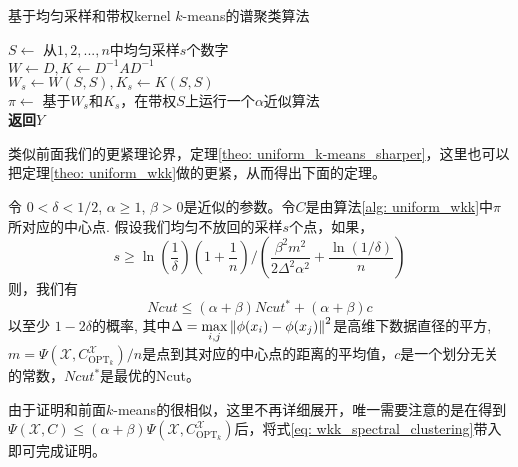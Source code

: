 \begin{algorithm}
	\SetNoFillComment
    \caption{基于均匀采样和带权kernel $k$-means的谱聚类算法}\label{alg: uniform_wkk}
    $S \gets$ 从$1,2,...,n$中均匀采样$s$个数字\\
    $W \gets D,K \gets D^{-1}AD^{-1}$\\
    $W_s \gets W(S,S), K_s \gets K(S,S)$\\
    $\pi \gets$ 基于$W_s$和$K_s$，在带权$S$上运行一个$\alpha$近似算法\\
    \textbf{返回}$Y$
\end{algorithm}
类似前面我们的更紧理论界，定理\ref{theo: uniform_k-means_sharper}，这里也可以把定理\ref{theo: uniform_wkk}做的更紧，从而得出下面的定理。
\begin{theorem}[均匀不放回采样的谱聚类解的质量]
    \label{theo: uniform_wkk_sharper}
    令 $0 < \delta <1/2$, $\alpha \geq 1$, $\beta >0$是近似的参数。令$C$是由算法\ref{alg: uniform_wkk}中$\pi$所对应的中心点. 假设我们均匀不放回的采样$s$个点，如果，
    \begin{equation*}
    s \geq \ln(\frac{1}{\delta})(1+\frac{1}{n})/(\frac{\beta^2 m^2}{2\Delta^2 \alpha^2}+\frac{\ln(1/\delta)}{n})
    \end{equation*}
    则，我们有
    \begin{equation*}
    Ncut \leq (\alpha + \beta) Ncut^* + (\alpha + \beta)c
    \end{equation*}
    以至少 $1-2\delta$的概率, 其中$\Delta = \max\limits_{i,j}\left\lVert\phi(x_i) - \phi(x_j)\right\rVert^2$是高维下数据直径的平方, $m = \Psi(\mathcal{X},C_{\text{OPT}_k}^{\mathcal{X}})/n$是点到其对应的中心点的距离的平均值，$c$是一个划分无关的常数，$Ncut^*$是最优的Ncut。
\end{theorem}
由于证明和前面$k$-means的很相似，这里不再详细展开，唯一需要注意的是在得到$\Psi(\mathcal{X},C) \leq (\alpha+\beta) \Psi(\mathcal{X},C_{\text{OPT}_k}^{\mathcal{X}})$后，将式\ref{eq: wkk_spectral_clustering}带入即可完成证明。